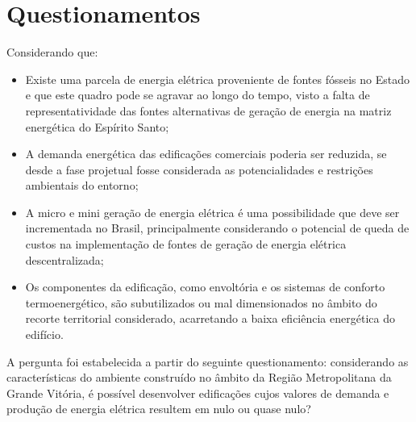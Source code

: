 \section{Questionamentos}
Considerando que:
\begin{itemize}
    \item Existe uma parcela de energia elétrica proveniente de fontes fósseis no 
    Estado e que este quadro pode se agravar ao longo do tempo, visto a falta de 
    representatividade das fontes alternativas de geração de energia na matriz 
    energética do Espírito Santo;
    \item A demanda energética das edificações comerciais poderia  ser reduzida,  se 
    desde a fase projetual fosse considerada as potencialidades e restrições 
    ambientais do entorno;
    \item A micro e mini geração de energia elétrica é uma possibilidade que deve ser 
    incrementada no Brasil, principalmente considerando o potencial de queda de custos 
    na implementação de fontes de geração de energia elétrica descentralizada;
    \item Os   componentes   da   edificação,   como   envoltória   e   os   sistemas   
    de   conforto termoenergético, são subutilizados ou mal dimensionados no âmbito do 
    recorte territorial considerado, acarretando a baixa eficiência energética do 
    edifício.
\end{itemize}
A pergunta foi estabelecida a partir do seguinte questionamento: 
considerando as características do  ambiente  construído  no  âmbito  da  Região  
Metropolitana  da  Grande  Vitória,  é  possível desenvolver edificações cujos valores 
de demanda e produção de energia elétrica resultem em nulo ou quase nulo?